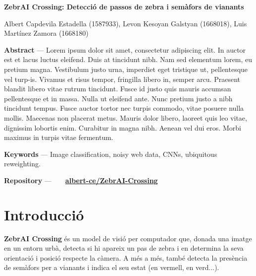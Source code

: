\documentclass[10pt,a4paper,twocolumn,twoside]{article}
\begin{document}
{\sffamily
\noindent\textbf{\LARGE ZebrAI Crossing: Detecció de passos de zebra i semàfors de vianants}
\begin{center}
Albert Capdevila Estadella (1587933), Levon Kesoyan Galstyan (1668018), Luis Martínez Zamora (1668180)
\end{center}

\bigskip

\noindent 
\textbf{Abstract} --- Lorem ipsum dolor sit amet, consectetur adipiscing elit. In auctor est et lacus luctus eleifend. Duis at tincidunt nibh. Nam sed elementum lorem, eu pretium magna. Vestibulum justo urna, imperdiet eget tristique ut, pellentesque vel turp-is. Vivamus et risus tempor, fringilla libero in, semper arcu. Praesent blandit libero vitae rutrum tincidunt. Fusce id justo quis mauris accumsan pellentesque et in massa. Nulla ut eleifend ante. Nunc pretium justo a nibh tincidunt tempus. Fusce auctor tortor nec turpis commodo, vitae posuere nulla mollis. Maecenas non placerat metus. Mauris dolor libero, laoreet quis leo vitae, dignissim lobortis enim. Curabitur in magna nibh. Aenean vel dui eros. Morbi maximus in turpis vitae fermentum.

\bigskip

\noindent 
\textbf{Keywords} --- Image classification, noisy web data, CNNs, ubiquitous reweighting.

\bigskip

\noindent
\textbf{Repository} ---\ \ 
\faGithub\ \  \href{https://github.com/albert-ce/ZebrAI-Crossing}{\small \textbf{albert-ce/ZebrAI-Crossing}}

{\vrule depth 0pt height 0.5pt width 3cm\hspace{7.5pt}%
%
\hspace{7.5pt}\vrule depth 0pt height 0.5pt width 3cm\relax}

}

\section{Introducció}

\textbf{ZebrAI Crossing} és un model de visió per computador que, donada una imatge en un entorn urbà, detecta si hi apareix un pas de zebra i en determina la seva orientació i posició respecte la càmera. A més a més, també detecta la presència de semàfors per a vianants i indica el seu estat (en vermell, en verd...).
\end{document}
